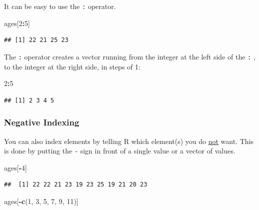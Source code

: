 \documentclass[
]{book}
\newenvironment{Shaded}{\begin{snugshade}}{\end{snugshade}}
\newcommand{\DecValTok}[1]{\textcolor[rgb]{0.00,0.00,0.81}{#1}}
\newcommand{\FunctionTok}[1]{\textcolor[rgb]{0.13,0.29,0.53}{\textbf{#1}}}
\newcommand{\NormalTok}[1]{#1}
\newcommand{\SpecialCharTok}[1]{\textcolor[rgb]{0.81,0.36,0.00}{\textbf{#1}}}
\begin{document}
It can be easy to use the \texttt{:} operator.

\begin{Shaded}
\begin{Highlighting}[]
\NormalTok{ages[}\DecValTok{2}\SpecialCharTok{:}\DecValTok{5}\NormalTok{]}
\end{Highlighting}
\end{Shaded}

\begin{verbatim}
## [1] 22 21 25 23
\end{verbatim}

The \texttt{:} operator creates a vector running from the integer at the left side of the \texttt{:} , to the integer at the right side, in steps of 1:

\begin{Shaded}
\begin{Highlighting}[]
\DecValTok{2}\SpecialCharTok{:}\DecValTok{5}
\end{Highlighting}
\end{Shaded}

\begin{verbatim}
## [1] 2 3 4 5
\end{verbatim}

\subsubsection{Negative Indexing}\label{negative-indexing}

You can also index elements by telling R which element(s) you do \ul{not} want. This is done by putting the \texttt{-} sign in front of a single value or a vector of values.

\begin{Shaded}
\begin{Highlighting}[]
\NormalTok{ages[}\SpecialCharTok{{-}}\DecValTok{4}\NormalTok{]}
\end{Highlighting}
\end{Shaded}

\begin{verbatim}
##  [1] 22 22 21 23 19 23 25 19 21 20 23
\end{verbatim}

\begin{Shaded}
\begin{Highlighting}[]
\NormalTok{ages[}\SpecialCharTok{{-}}\FunctionTok{c}\NormalTok{(}\DecValTok{1}\NormalTok{, }\DecValTok{3}\NormalTok{, }\DecValTok{5}\NormalTok{, }\DecValTok{7}\NormalTok{, }\DecValTok{9}\NormalTok{, }\DecValTok{11}\NormalTok{)]}
\end{Highlighting}
\end{Shaded}
\end{document}
